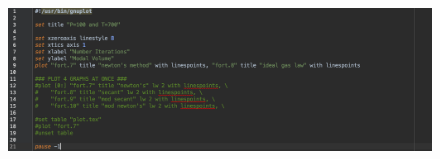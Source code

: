 \documentclass[12pt, letterpaper]{article}
\begin{document}
		\begin{figure}[h]
			\centering
			\includegraphics[width=\linewidth]{gnuplotscript.png}
		\end{figure}
\end{document}
